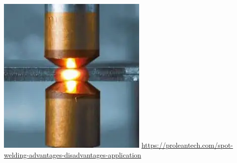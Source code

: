 \documentclass[handout, usenames,dvipsnames, nosymbols,aspectratio=169]{beamer}
\begin{document}
\begin{frame}
\begin{minipage}{0.3\textwidth}
			\includegraphics[width=\textwidth]{images/Copper-electrodes-create-a-spot-weld.png}
			\tiny
			{\color{gray}\url{https://proleantech.com/spot-welding-advantages-disadvantages-application}}
		\end{minipage}
		
	\end{frame}
	
\end{document}
